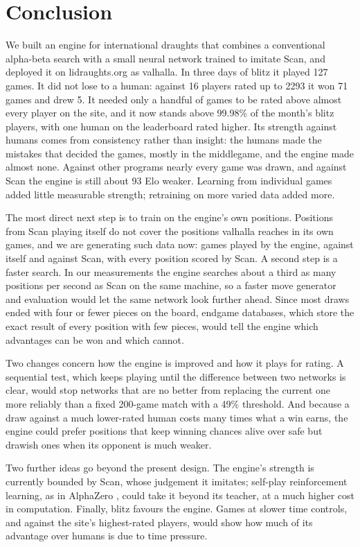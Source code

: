 \section{Conclusion}\label{sec:concl}

We built an engine for international draughts that combines a conventional
alpha-beta search with a small neural network trained to imitate Scan, and
deployed it on lidraughts.org as valhalla. In three days of blitz it played 127
games. It did not lose to a human: against 16 players rated up to 2293 it won 71
games and drew 5. It needed only a handful of games to be rated above almost every
player on the site, and it now stands above 99.98\% of the month's blitz players,
with one human on the leaderboard rated higher. Its strength against humans comes
from consistency rather than insight: the humans made the mistakes that decided
the games, mostly in the middlegame, and the engine made almost none. Against
other programs nearly every game was drawn, and against Scan the engine is still
about 93 Elo weaker. Learning from individual games added little measurable
strength; retraining on more varied data added more.

The most direct next step is to train on the engine's own positions. Positions
from Scan playing itself do not cover the positions valhalla reaches in its own
games, and we are generating such data now: games played by the engine, against
itself and against Scan, with every position scored by Scan. A second step is a
faster search. In our measurements the engine searches about a third as many
positions per second as Scan on the same machine, so a faster move generator and
evaluation would let the same network look further ahead. Since most draws ended
with four or fewer pieces on the board, endgame databases, which store the exact
result of every position with few pieces, would tell the engine which advantages
can be won and which cannot.

Two changes concern how the engine is improved and how it plays for rating. A
sequential test, which keeps playing until the difference between two networks
is clear, would stop networks that are no better from replacing the current one
more reliably than a fixed 200-game match with a 49\% threshold. And because a
draw against a much lower-rated human costs many times what a win earns, the
engine could prefer positions that keep winning chances alive over safe but
drawish ones when its opponent is much weaker.

Two further ideas go beyond the present design. The engine's strength is
currently bounded by Scan, whose judgement it imitates; self-play reinforcement
learning, as in AlphaZero \parencite{silver2018}, could take it beyond its
teacher, at a much higher cost in computation. Finally, blitz favours the engine.
Games at slower time controls, and against the site's highest-rated players,
would show how much of its advantage over humans is due to time pressure.
